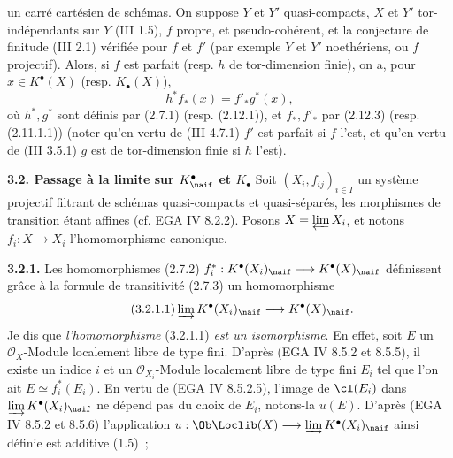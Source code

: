 un
carré cartésien de schémas. On suppose \(Y\) et \(Y'\) quasi-compacts, \(X\) et \(Y'\) tor-indépendants sur \(Y\) (III 1.5), \(f\) propre, et pseudo-cohérent, et la conjecture de finitude (III 2.1) vérifiée pour \(f\) et \(f'\) (par exemple \(Y\) et \(Y'\) noethériens, ou \(f\) projectif). Alors, si \(f\) est parfait (resp. \(h\) de tor-dimension finie), on a, pour \(x\in K^{\bullet}(X)\) (resp. \(K_{\bullet}(X)\)),
\[
 h^* f_*(x)=f'_* g^*(x),
\]
où \(h^*,g^*\) sont définis par (2.7.1) (resp. (2.12.1)), et \(f_*,f'_*\) par (2.12.3) (resp. (2.11.1.1)) (noter qu'en vertu de (III 4.7.1) \(f'\) est parfait si \(f\) l'est, et qu'en vertu de (III 3.5.1) \(g\) est de tor-dimension finie si \(h\) l'est).

\textbf{3.2. Passage à la limite sur \(K^{\bullet}_{\naif}\) et \(K_{\bullet}\)} Soit \((X_i,f_{ij})_{i\in I}\) un système projectif filtrant de schémas quasi-compacts et quasi-séparés, les morphismes de transition étant affines (cf. EGA IV 8.2.2). Posons \(X=\varprojlim X_i\), et notons \(f_i:X\to X_i\) l'homomorphisme canonique.

\textbf{3.2.1.} Les homomorphismes (2.7.2) \(f_i^*:K^{\bullet}(X_i)_{\naif}\longrightarrow K^{\bullet}(X)_{\naif}\) définissent grâce à la formule de transitivité (2.7.3) un homomorphisme
\begin{equation}\tag{3.2.1.1}
 \varinjlim K^{\bullet}(X_i)_{\naif}\longrightarrow K^{\bullet}(X)_{\naif}.
\end{equation}
Je dis que \emph{l'homomorphisme} (3.2.1.1) \emph{est un isomorphisme}. En effet, soit \(E\) un \(\mathcal O_X\)-Module localement libre de type fini. D'après (EGA IV 8.5.2 et 8.5.5), il existe un indice \(i\) et un \(\mathcal O_{X_i}\)-Module localement libre de type fini \(E_i\) tel que l'on ait \(E\simeq f_i^*(E_i)\). En vertu de (EGA IV 8.5.2.5), l'image de \(\cl(E_i)\) dans \(\varinjlim K^{\bullet}(X_i)_{\naif}\) ne dépend pas du choix de \(E_i\), notons-la \(u(E)\). D'après (EGA IV 8.5.2 et 8.5.6) l'application
\(u:\Ob\Loclib(X)\longrightarrow \varinjlim K^{\bullet}(X_i)_{\naif}\) ainsi définie est additive (1.5)~;
